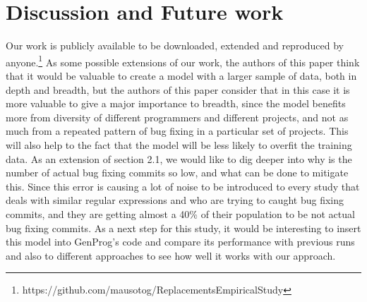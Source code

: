 
\section{Discussion and Future work}
Our work is publicly available to be downloaded, extended and reproduced by anyone.\footnote{https://github.com/mausotog/ReplacementsEmpiricalStudy}
As some possible extensions of our work, the authors of this paper think that it would be valuable to create a model with a larger sample of data, both in depth and breadth, but the authors of this paper consider that in this case it is more valuable to give a major importance to breadth, since the model benefits more from diversity of different programmers and different projects, and not as much from a repeated pattern of bug fixing in a particular set of projects. This will also help to the fact that the model will be less likely to overfit the training data.
As an extension of section 2.1, we would like to dig deeper into why is the number of actual bug fixing commits so low, and what can be done to mitigate this. Since this error is causing a lot of noise to be introduced to every study that deals with similar regular expressions and who are trying to caught bug fixing commits, and they are getting almost a 40\% of their population to be not actual bug fixing commits.
As a next step for this study, it would be interesting to insert this model into GenProg's code and compare its performance with previous runs and also to different approaches to see how well it works with our approach.
